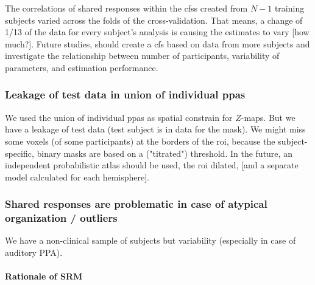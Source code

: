 

The correlations of shared responses within the \acp{cfs} created from $N-1$
training subjects varied across the folds of the cross-validation.
That means, a change of 1/13 of the data for every subject's analysis is causing
the estimates to vary [how much?].
Future studies, should create a \ac{cfs} based on data from more subjects and
investigate the relationship between number of participants, variability of
parameters, and estimation performance.



\subsubsection{Leakage of test data in union of individual \acp{ppa}}
%
We used the union of individual \acp{ppa} as spatial constrain for $Z$-maps.
%
But we have a leakage of test data (test subject is in data for the mask).
%
We might miss some voxels (of some participants) at the borders of the \ac{roi},
because the subject-specific, binary masks are based on a ("titrated")
threshold.  \citep{sengupta2016extension}
%
In the future, an independent probabilistic atlas should be used, the \ac{roi}
dilated, [and a separate model calculated for each hemisphere].



\subsubsection{Shared responses are problematic in case of atypical organization
/ outliers}




We have a non-clinical sample of subjects but variability (especially in case of
auditory PPA).


\paragraph{Rationale of SRM}

